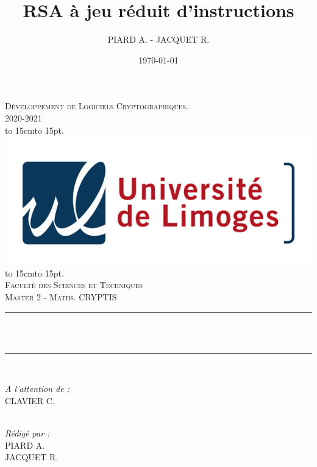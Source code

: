 \documentclass[12pt]{article}
\title{RSA à jeu réduit d'instructions}
\author{PIARD A. - JACQUET R.}
\date{\today}
\makeatletter
\let\thetitle\@title
\def\dotfill#1{\cleaders\hbox to #1{.}\hfill}
\newcommand\dotline[2][.5em]{\leavevmode\hbox to #2{\dotfill{#1}\hfil}}
\theoremstyle{definition}\newtheorem{defn}{Définition}
\theoremstyle{definition}\newtheorem{exm}{Exemple}
\theoremstyle{definition}\newtheorem{rem}{Remarque}
\theoremstyle{definition}\newtheorem{algo}{Algorithme}
\theoremstyle{remark}\newtheorem{exo}{Exercice}
\theoremstyle{remark}\newtheorem{nota}{Notation}
\makeatother
\begin{document}

\begin{titlepage}
	\centering
    \vspace*{0.5 cm}
    \textsc{\LARGE Développement de Logiciels Cryptographiques.\\
    \vspace{12pt}
2020-2021}\\[1.0 cm]
    \dotline[15pt]{15cm}\\
	\includegraphics[scale = 2.2]{logo.png}
	\dotline[15pt]{15cm}\\
	\vspace{1.5cm}
	\textsc{\Large Faculté des Sciences et Techniques}\\
	\textsc{\large Master 2 - Maths. CRYPTIS}\\[1.0 cm]
	\rule{\linewidth}{0.2 mm} \\[0.4 cm]
	{ \huge \bfseries \color{blue} \thetitle}\\
	\rule{\linewidth}{0.2 mm} \\[1.5 cm]
	
	\begin{minipage}{0.4\textwidth}
		\begin{flushleft} \large
			\emph{A l'attention de :}\\
			CLAVIER C.\\
			\phantom{a}\\
		\end{flushleft}
	\end{minipage}
	\begin{minipage}{0.5\textwidth}
    	\begin{flushright} \large
		\emph{Rédigé par :}\\
		PIARD A.\\
		JACQUET R.\\
		\end{flushright}
	\end{minipage}\\[2 cm]
\end{titlepage}
\end{document}

